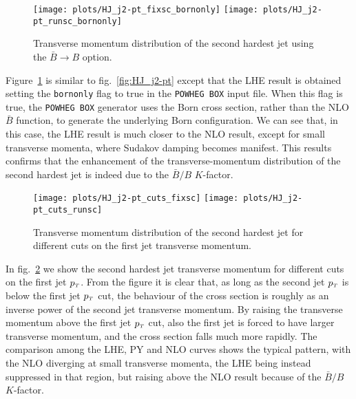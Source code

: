 \documentclass[paper]{JHEP3}
\newlength{\hfig}
\newlength{\hfigs}
\newcommand\sss{\mathchoice%
{\displaystyle}%
{\scriptstyle}%
{\scriptscriptstyle}%
{\scriptscriptstyle}%
}
\newcommand\pT{p_{\sss T}}
\newcommand\POWHEGBOX{{\tt POWHEG BOX}}
\begin{document}
\begin{figure}[htb]
\begin{center}
\texttt{[image: plots/HJ\_j2-pt\_fixsc\_bornonly]} \nolinebreak
\texttt{[image: plots/HJ\_j2-pt\_runsc\_bornonly]} 
\caption{Transverse momentum distribution of the second hardest jet using the
  $\bar{B}\to B$ option.}
\label{fig:HJ_j2-pt_bornonly}
\end{center}
\end{figure}
Figure~\ref{fig:HJ_j2-pt_bornonly} is similar to fig.~\ref{fig:HJ_j2-pt}
except that the LHE result is obtained setting the {\tt bornonly} flag to
true in the \POWHEGBOX{} input file. When this flag is true, the \POWHEGBOX{}
generator uses the Born cross section, rather than the NLO $\bar{B}$
function, to generate the underlying Born configuration. We can see that, in
this case, the LHE result is much closer to the NLO result, except for small
transverse momenta, where Sudakov damping becomes manifest. This results
confirms that the enhancement of the transverse-momentum distribution of the
second hardest jet is indeed due to the $\bar{B}/B$ $K$-factor.


\begin{figure}[htb]
\begin{center}
\texttt{[image: plots/HJ\_j2-pt\_cuts\_fixsc]}\nolinebreak
\texttt{[image: plots/HJ\_j2-pt\_cuts\_runsc]}
\caption{Transverse momentum distribution of the second hardest jet for
  different cuts on the first jet transverse momentum.}
\label{fig:HJ_j2-pt_cuts}
\end{center}
\end{figure}
In fig.~\ref{fig:HJ_j2-pt_cuts} we show the second hardest jet transverse
momentum for different cuts on the first jet $\pT$. From the figure it is
clear that, as long as the second jet $\pT$ is below the first jet $\pT$ cut,
the behaviour of the cross section is roughly as an inverse power of the
second jet transverse momentum.  By raising the transverse momentum above the
first jet $\pT$ cut, also the first jet is forced to have larger transverse
momentum, and the cross section falls much more rapidly. The comparison among
the LHE, PY and NLO curves shows the typical pattern, with the NLO diverging
at small transverse momenta, the LHE being instead suppressed in that region,
but raising above the NLO result because of the $\bar{B}/B$ $K$-factor.
\end{document}
